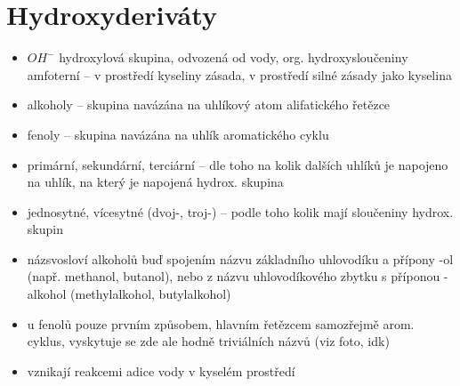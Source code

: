 \documentclass{article}
\begin{document}
\section{Hydroxyderiváty}
\begin{itemize}
  \item $OH^-$ hydroxylová skupina, odvozená od vody, org. hydroxysloučeniny amfoterní -- v prostředí kyseliny zásada, v prostředí silné zásady jako kyselina
  \item alkoholy -- skupina navázána na uhlíkový atom alifatického řetězce
  \item fenoly -- skupina navázána na uhlík aromatického cyklu
  \item primární, sekundární, terciární -- dle toho na kolik dalších uhlíků je napojeno na uhlík, na který je napojená hydrox. skupina
  \item jednosytné, vícesytné (dvoj-, troj-) -- podle toho kolik mají sloučeniny hydrox. skupin
  \item názsvosloví alkoholů buď spojením názvu základního uhlovodíku a přípony -ol (např. methanol, butanol), nebo z názvu uhlovodíkového zbytku s příponou -alkohol (methylalkohol, butylalkohol)
  \item u fenolů pouze prvním způsobem, hlavním řetězcem samozřejmě arom. cyklus, vyskytuje se zde ale hodně triviálních názvů (viz foto, idk)
  \item vznikají reakcemi adice vody v kyselém prostředí
\end{itemize}
\end{document}
